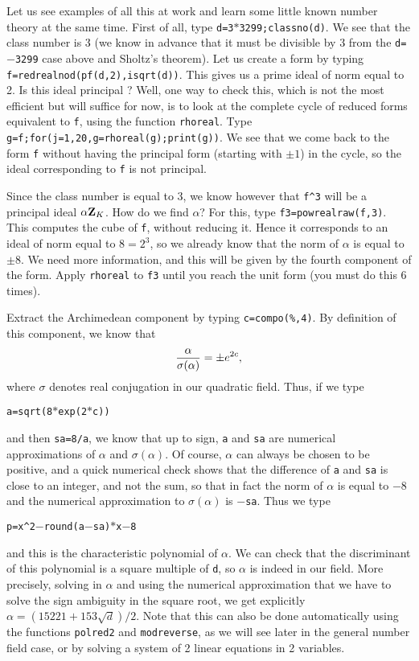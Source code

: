 Let us see examples of all this at work and learn some little known
number theory at the same time. First of all, type {\tt d=3$*$3299;classno(d)}.
We see that the class number is 3 (we know in advance that it must be
divisible by 3 from the {\tt d=$-$3299} case above and Sholtz's theorem).
Let us create a form
by typing {\tt f=redrealnod(pf(d,2),isqrt(d))}. This gives us a prime ideal
of norm equal to 2. Is this ideal principal ? Well, one way to check this,
which is not the most efficient but will suffice for now, is to look at
the complete cycle of reduced forms equivalent to {\tt f}, using the
function {\tt rhoreal}. Type {\tt g=f;for(j=1,20,g=rhoreal(g);print(g))}.
We see that we come back to the form {\tt f} without having the principal
form (starting with $\pm1$) in the cycle, so the ideal corresponding to
{\tt f} is not principal. 

Since the class number is equal to 3, we know however that {\tt f\^{}3} will be
a principal ideal $\alpha{\bf Z}_K$. How do we find $\alpha$? For this, type
{\tt f3=powrealraw(f,3)}. This computes the cube of {\tt f}, without reducing
it. Hence it corresponds to an ideal of norm equal to $8=2^3$, so we already
know that the norm of $\alpha$ is equal to $\pm8$. We need more information,
and this will be given by the fourth component of the form. Apply {\tt rhoreal}
to {\tt f3} until you reach the unit form (you must do this 6 times).

Extract the Archimedean component by typing {\tt c=compo(\%,4)}. By
definition of this component, we know that 
$${\alpha\over{\sigma(\alpha)}}=\pm e^{2c},$$
where $\sigma$ denotes real conjugation in our quadratic field. Thus, if we type 

\centerline{\tt a=sqrt(8$*$exp(2$*$c))}

and then {\tt sa=8/a}, we know that up to sign, {\tt a} and {\tt sa} are
numerical approximations of $\alpha$ and $\sigma(\alpha)$. Of course, $\alpha$
can always be chosen to be positive, and a quick numerical check shows that
the difference of {\tt a} and {\tt sa} is close to an integer, and not the sum,
so that in fact the norm of $\alpha$ is equal to $-8$ and the numerical 
approximation to $\sigma(\alpha)$ is {\tt $-$sa}. Thus we type

\centerline{\tt p=x\^{}2$-$round(a$-$sa)$*$x$-$8}

and this is the characteristic polynomial of $\alpha$. We can check that
the discriminant of this polynomial is a square multiple of {\tt d}, so
$\alpha$ is indeed in our field. More precisely, solving in $\alpha$
and using the numerical approximation that we have to solve the sign 
ambiguity in the square root, we get explicitly $\alpha=(15221+153\sqrt d)/2$.
Note that this can also be done automatically using the functions {\tt polred2}
and {\tt modreverse}, as we will see later in the general number field case,
or by solving a system of 2 linear equations in 2 variables.

